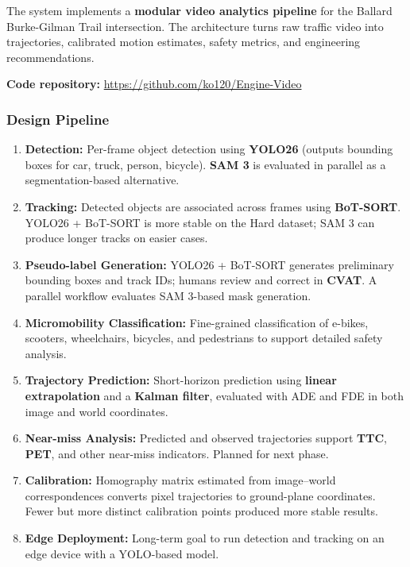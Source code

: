 \documentclass[12pt,letterpaper]{article}
\begin{document}
The system implements a \textbf{modular video analytics pipeline} for the Ballard Burke-Gilman Trail intersection. The architecture turns raw traffic video into trajectories, calibrated motion estimates, safety metrics, and engineering recommendations.

\textbf{Code repository:} \url{https://github.com/ko120/Engine-Video}

\subsubsection{Design Pipeline}

\begin{enumerate}
    \item \textbf{Detection:} Per-frame object detection using \textbf{YOLO26} (outputs bounding boxes for car, truck, person, bicycle). \textbf{SAM 3} is evaluated in parallel as a segmentation-based alternative.

    \item \textbf{Tracking:} Detected objects are associated across frames using \textbf{BoT-SORT}. YOLO26 + BoT-SORT is more stable on the Hard dataset; SAM 3 can produce longer tracks on easier cases.

    \item \textbf{Pseudo-label Generation:} YOLO26 + BoT-SORT generates preliminary bounding boxes and track IDs; humans review and correct in \textbf{CVAT}. A parallel workflow evaluates SAM 3-based mask generation.

    \item \textbf{Micromobility Classification:} Fine-grained classification of e-bikes, scooters, wheelchairs, bicycles, and pedestrians to support detailed safety analysis.

    \item \textbf{Trajectory Prediction:} Short-horizon prediction using \textbf{linear extrapolation} and a \textbf{Kalman filter}, evaluated with ADE and FDE in both image and world coordinates.

    \item \textbf{Near-miss Analysis:} Predicted and observed trajectories support \textbf{TTC}, \textbf{PET}, and other near-miss indicators. Planned for next phase.

    \item \textbf{Calibration:} Homography matrix estimated from image--world correspondences converts pixel trajectories to ground-plane coordinates. Fewer but more distinct calibration points produced more stable results.

    \item \textbf{Edge Deployment:} Long-term goal to run detection and tracking on an edge device with a YOLO-based model.
\end{enumerate}
\end{document}

